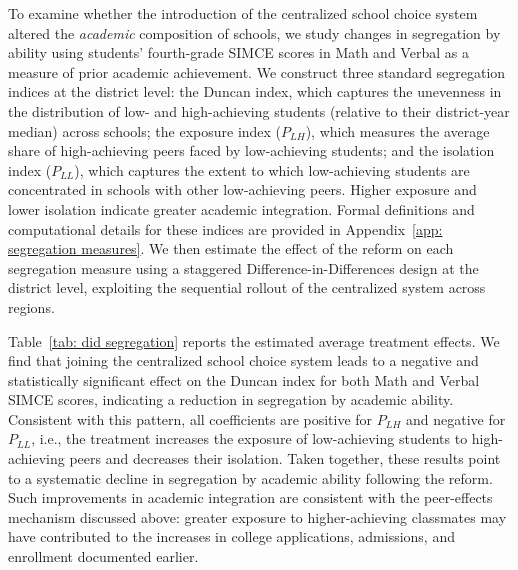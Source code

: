 \documentclass[11pt]{article}
\begin{document}
To examine whether the introduction of the centralized school choice system altered the \emph{academic} composition of schools, we study changes in segregation by ability using students' fourth-grade SIMCE scores in Math and Verbal as a measure of prior academic achievement. We construct three standard segregation indices at the district level: the Duncan index, which captures the unevenness in the distribution of low- and high-achieving students (relative to their district-year median) across schools; the exposure index ($P_{LH}$), which measures the average share of high-achieving peers faced by low-achieving students; and the isolation index ($P_{LL}$), which captures the extent to which low-achieving students are concentrated in schools with other low-achieving peers. Higher exposure and lower isolation indicate greater academic integration. Formal definitions and computational details for these indices are provided in Appendix~\ref{app: segregation measures}. We then estimate the effect of the reform on each segregation measure using a staggered Difference-in-Differences design at the district level, exploiting the sequential rollout of the centralized system across regions.

Table~\ref{tab: did segregation} reports the estimated average treatment effects. We find that joining the centralized school choice system leads to a negative and statistically significant effect on the Duncan index for both Math and Verbal SIMCE scores, indicating a reduction in segregation by academic ability. Consistent with this pattern, all coefficients are positive for $P_{LH}$ and negative for $P_{LL}$, i.e., the treatment increases the exposure of low-achieving students to high-achieving peers and decreases their isolation.
Taken together, these results point to a systematic decline in segregation by academic ability following the reform. Such improvements in academic integration are consistent with the peer-effects mechanism discussed above: greater exposure to higher-achieving classmates may have contributed to the increases in college applications, admissions, and enrollment documented earlier.



\end{document}
